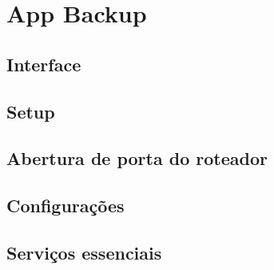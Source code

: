 \section{App Backup}
\subsection{Interface}
\subsection{Setup}
\subsection{Abertura de porta do roteador}
\subsection{Configurações}
\subsection{Serviços essenciais}
